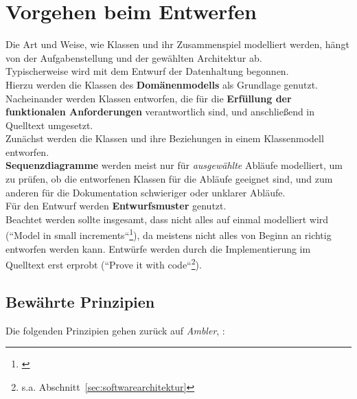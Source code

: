 \section{Vorgehen beim Entwerfen}\label{sec:vorgehen-beim-entwerfen}
Die Art und Weise, wie Klassen und ihr Zusammenspiel modelliert werden, hängt von der Aufgabenstellung und der gewählten Architektur ab.\\

\noindent
Typischerweise wird mit dem Entwurf der Datenhaltung begonnen.\\
Hierzu werden die Klassen des \textbf{Domänenmodells} als Grundlage genutzt.\\

\noindent
Nacheinander werden Klassen entworfen, die für die \textbf{Erfüllung der funktionalen Anforderungen} verantwortlich sind, und anschließend in Quelltext umgesetzt.\\

\noindent
Zunächst werden die Klassen und ihre Beziehungen in einem Klassenmodell entworfen.\\

\noindent
\textbf{Sequenzdiagramme} werden meist nur für \textit{ausgewählte} Abläufe modelliert, um zu prüfen, ob die entworfenen Klassen für die Abläufe geeignet sind, und zum anderen für die Dokumentation schwieriger oder unklarer Abläufe.\\

\noindent
Für den Entwurf werden \textbf{Entwurfsmuster} genutzt.\\

\noindent
Beachtet werden sollte insgesamt, dass nicht alles auf einmal modelliert wird (``Model in small increments``\footnote{\cite[51]{Wed09b}}), da meistens nicht alles von Beginn an richtig entworfen werden kann.
Entwürfe werden durch die Implementierung im Quelltext erst erprobt (``Prove it with code``\footnote{
    s.a. Abschnitt~\ref{sec:softwarearchitektur}
}).

\subsection*{Bewährte Prinzipien}

Die folgenden Prinzipien gehen zurück auf \textit{Ambler}, \cite[112, Table 4.2. The Supplementary Principles of AM]{Amb04}:


